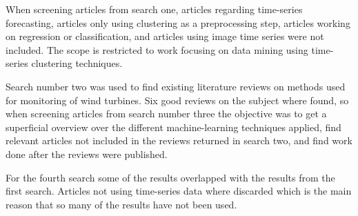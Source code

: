 When screening articles from search one, articles regarding time-series forecasting, articles only using clustering as a preprocessing step, articles working on regression or classification, and articles using image time series were not included. The scope is restricted to work focusing on data mining using time-series clustering techniques. \bigskip

Search number two was used to find existing literature reviews on methods used for monitoring of wind turbines. Six good reviews on the subject where found, so when screening articles from search number three the objective was to get a superficial overview over the different machine-learning techniques applied, find relevant articles not included in the reviews returned in search two, and find work done after the reviews were published. \bigskip

For the fourth search some of the results overlapped with the results from the first search. Articles not using time-series data where discarded which is the main reason that so many of the results have not been used.